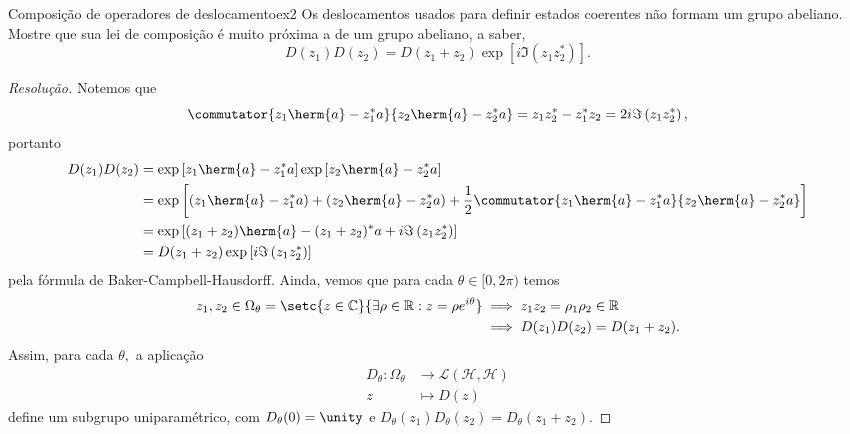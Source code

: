 \begin{exercício}{Composição de operadores de deslocamento}{ex2}
   Os deslocamentos usados para definir estados coerentes não formam um grupo abeliano. Mostre que sua lei de composição é muito próxima a de um grupo abeliano, a saber,
   \begin{equation*}
      D(z_1) D(z_2) = D(z_1 + z_2) \exp\left[i \Im(z_1 z_2^*)\right].
   \end{equation*}
\end{exercício}
\begin{proof}[Resolução]
   Notemos que
   \begin{equation*}
      \commutator{z_1 \herm{a} - z_1^* a}{z_2 \herm{a} - z_2^* a} = z_1 z_2^* -  z_1^* z_2 = 2i \Im\left(z_1 z_2^*\right),
   \end{equation*}
   portanto
   \begin{align*}
      D(z_1)D(z_2) &= \exp\left[z_1 \herm{a} - z_1^* a\right]\exp\left[z_2 \herm{a} - z_2^* a\right]\\
                   &= \exp\left[\left(z_1 \herm{a} - z_1^* a\right) + \left(z_2 \herm{a} - z_2^* a\right) + \frac12\commutator{z_1 \herm{a} - z_1^* a}{z_2 \herm{a} - z_2^* a} \right]\\
                   &= \exp\left[(z_1 + z_2) \herm{a} - (z_1 + z_2)^* a + i \Im\left(z_1 z_2^*\right)\right]\\
                   &= D(z_1 + z_2) \exp\left[i \Im\left(z_1 z_2^*\right)\right]
   \end{align*}
   pela fórmula de Baker-Campbell-Hausdorff. Ainda, vemos que para cada \(\theta \in [0,2\pi)\)  temos
   \begin{align*}
      z_1, z_2 \in \Omega_\theta = \setc{z \in \mathbb{C}}{\exists \rho \in \mathbb{R} : z = \rho e^{i\theta}}
      &\implies z_1 z_2 = \rho_1 \rho_2 \in \mathbb{R}\\
      &\implies D(z_1)D(z_2) = D(z_1 + z_2).
   \end{align*}
   Assim, para cada \(\theta,\) a aplicação
   \begin{align*}
      D_\theta : \Omega_\theta &\to \mathcal{L}(\mathscr{H}, \mathscr{H})\\
                             z &\mapsto D(z)
   \end{align*}
   define um subgrupo uniparamétrico, com \(D_\theta(0) = \unity\) e \(D_\theta(z_1)D_\theta(z_2) = D_\theta(z_1 + z_2).\)
\end{proof}
